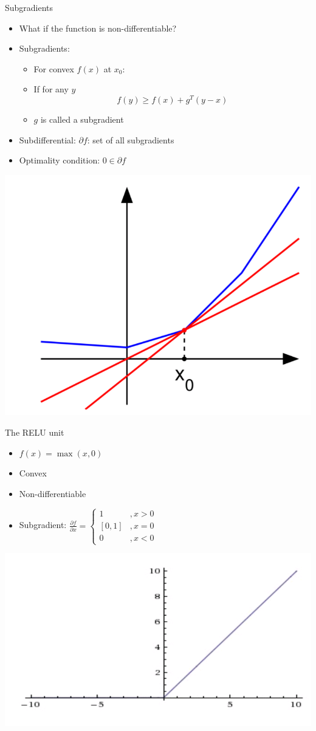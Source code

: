 \documentclass[12pt,notes,mathserif]{beamer}
\providecommand{\tightlist}{%
	\setlength{\itemsep}{0pt}\setlength{\parskip}{0pt}}
\begin{document}
\begin{frame}{Subgradients}

\begin{itemize}
\tightlist
\item
  What if the function is non-differentiable?
\item
  Subgradients:

  \begin{itemize}
  \tightlist
  \item
    For convex \(f(x)\) at \(x_{0}\):\\
  \item
    If for any \(y\) \[f(y)\geq f(x)+g^T(y-x)\]
  \item
    \(g\) is called a subgradient
  \end{itemize}
\item
  Subdifferential: \(\partial f\): set of all subgradients
\item
  Optimality condition: \(0\in\partial f\)
\end{itemize}

\begin{center}
    \includegraphics[width=.375\textwidth]{2018-04-15-13-10-32.png}
\end{center}

\end{frame}

\begin{frame}{The RELU unit}

\begin{itemize}
\tightlist
\item
  \(f(x)=\max(x,0)\)
\item
  Convex
\item
  Non-differentiable
\item
  Subgradient:
  \(\frac{\partial f}{\partial x}=\begin{cases} 1 &,x>0 \\ [0,1]&,x=0 \\ 0&,x<0 \end{cases}\)
\end{itemize}

\begin{center}
    \includegraphics[width=.5\textwidth]{2018-04-15-13-10-48.png}
\end{center}

\end{frame}
\end{document}
